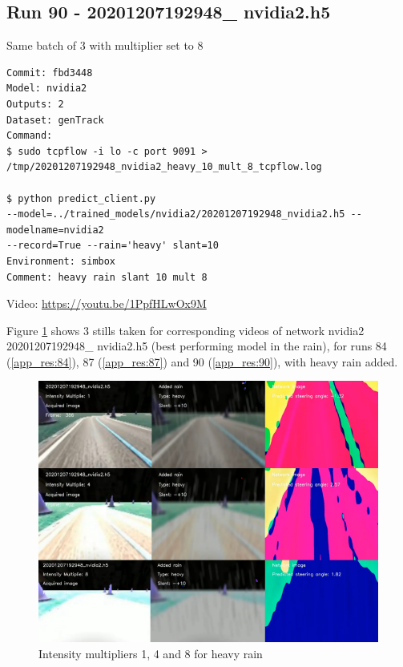 \subsection{Run 90 - 20201207192948\_ nvidia2.h5 }
Same batch of 3 with multiplier set to 8
\label{app_res:90}
\begin{verbatim}
Commit: fbd3448
Model: nvidia2 
Outputs: 2
Dataset: genTrack
Command:
$ sudo tcpflow -i lo -c port 9091 > 
/tmp/20201207192948_nvidia2_heavy_10_mult_8_tcpflow.log

$ python predict_client.py
--model=../trained_models/nvidia2/20201207192948_nvidia2.h5 --modelname=nvidia2 
--record=True --rain='heavy' slant=10
Environment: simbox
Comment: heavy rain slant 10 mult 8
\end{verbatim}
Video: \url{https://youtu.be/1PpfHLwOx9M}

Figure \ref{fig:20201207192948_nvidia2_mult_1_4_8_heavy} shows 3 stills taken for corresponding videos of network nvidia2 20201207192948\_ nvidia2.h5 (best performing model in the rain), for runs 84 (\ref{app_res:84}), 87 (\ref{app_res:87}) and 90 (\ref{app_res:90}), with heavy rain added.

\begin{figure}[ht]
 \centering 
 \includegraphics[width=\textwidth]{Figures/20201207192948_nvidia2_mult_1_4_8_heavy.png}
 \caption{Intensity multipliers 1, 4 and 8 for heavy rain}
 \label{fig:20201207192948_nvidia2_mult_1_4_8_heavy}
\end{figure}

